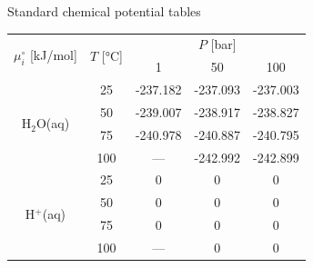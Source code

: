 \begin{frame}[allowframebreaks]{Standard chemical potential tables}
\begin{center}
{\footnotesize{}}%
\begin{tabular*}{1\columnwidth}{@{\extracolsep{\fill}}ccccc}
\toprule 
\multirow{2}{*}{$\mu_{i}^{\circ}$ {[}kJ/mol{]}} & \multirow{2}{*}{{\footnotesize{}$T$ {[}°C{]}}} & \multicolumn{3}{c}{{\footnotesize{}$P$ {[}bar{]}}}\tabularnewline
\cmidrule{3-5} \cmidrule{4-5} \cmidrule{5-5} 
 &  & {\footnotesize{}1} & {\footnotesize{}50} & {\footnotesize{}100}\tabularnewline
\midrule
\multirow{4}{*}{{\footnotesize{}H$_{2}$O(aq)}} & {\footnotesize{}25} & {\footnotesize{}-237.182} & {\footnotesize{}-237.093} & {\footnotesize{}-237.003}\tabularnewline
 & {\footnotesize{}50} & {\footnotesize{}-239.007} & {\footnotesize{}-238.917} & {\footnotesize{}-238.827}\tabularnewline
 & {\footnotesize{}75} & {\footnotesize{}-240.978} & {\footnotesize{}-240.887} & {\footnotesize{}-240.795}\tabularnewline
 & {\footnotesize{}100} & {\footnotesize{}—} & {\footnotesize{}-242.992} & {\footnotesize{}-242.899}\tabularnewline
\midrule 
\multirow{4}{*}{{\footnotesize{}H$^{+}$(aq)}} & {\footnotesize{}25} & {\footnotesize{}0} & {\footnotesize{}0} & {\footnotesize{}0}\tabularnewline
 & {\footnotesize{}50} & {\footnotesize{}0} & {\footnotesize{}0} & {\footnotesize{}0}\tabularnewline
 & {\footnotesize{}75} & {\footnotesize{}0} & {\footnotesize{}0} & {\footnotesize{}0}\tabularnewline
 & {\footnotesize{}100} & {\footnotesize{}—} & {\footnotesize{}0} & {\footnotesize{}0}\tabularnewline
\bottomrule
\end{tabular*}{\footnotesize\par}
\par\end{center}

\begin{center}
\framebreak
\par\end{center}


\end{frame}
